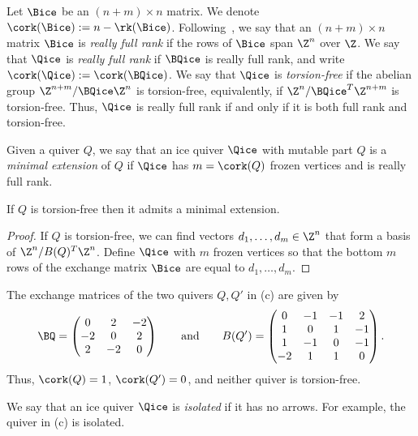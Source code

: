 %
%
%
%
%
%
%
%
%
%
%
%
%
%
%
%
 
%

Let $\Bice$ be an $(n+m)\times n$ matrix. We denote $\cork(\Bice):=n-\rk(\Bice)$. Following~\cite{LS}, we say that an $(n+m)\times n$ matrix $\Bice$ is \emph{really full rank} if the rows of $\Bice$ span $\Z^n$ over $\Z$. We say that $\Qice$ is \emph{really full rank} if $\BQice$ is really full rank, and write $\cork(\Qice):=\cork(\BQice)$.   We say that $\Qice$ is \emph{torsion-free} if the abelian group $\Z^{n+m}/\BQice \Z^n$ is torsion-free, equivalently, if $\Z^n/\BQice^T \Z^{n+m}$ is torsion-free.  Thus, $\Qice$ is really full rank if and only if it is both full rank and torsion-free.

\begin{definition}
Given a quiver $Q$, we say that an ice quiver $\Qice$ with mutable part $Q$ is a \emph{minimal extension} of $Q$ if $\Qice$ has $m=\cork(Q)$ frozen vertices and is really full rank.
\end{definition}

\begin{lemma}\label{lem:ext}
If $Q$ is torsion-free then it admits a minimal extension.
%
\end{lemma}
\begin{proof}
If $Q$ is torsion-free, we can find vectors $d_1,\ldots,d_m \in \Z^n$ that form a basis of $\Z^n/B(Q)^T \Z^n$.  Define $\Qice$ with $m$ frozen vertices so that the bottom $m$ rows of the exchange matrix $\Bice$ are equal to $d_1,\ldots,d_m$.
\end{proof}
%
%

\begin{example}
The exchange matrices of the two quivers $Q,Q'$ in (c) are given by
$$
\BQ=\begin{pmatrix}
0 & 2 & -2 \\
-2&0&2\\
2&-2&0
\end{pmatrix} \qquad \text{and} \qquad
B(Q')=\begin{pmatrix}
0 & -1& -1 &2 \\
1&0&1 &-1\\
1&-1&0 &-1 \\
-2&1&1&0
\end{pmatrix}.
$$
Thus, $\cork(Q)=1$, $\cork(Q')=0$, and neither quiver is torsion-free.
\end{example}

We say that an ice quiver $\Qice$ is \emph{isolated} if it has no arrows. For example, the quiver in (c) is isolated.

